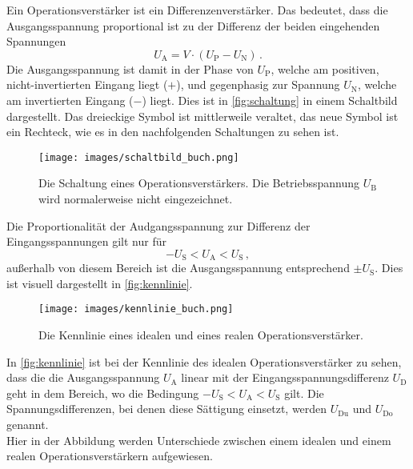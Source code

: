         \noindent 
        Ein Operationsverstärker ist ein Differenzenverstärker. Das bedeutet, dass die Ausgangsspannung proportional ist zu der Differenz der beiden 
        eingehenden Spannungen 
        \begin{equation*}
            U_\text{A} = V \cdot \left( U_\text{P} - U_\text{N}\right)\, .
        \end{equation*}
        Die Ausgangsspannung ist damit in der Phase von $U_\text{P}$, welche am positiven, nicht-invertierten Eingang liegt ($+$), und gegenphasig zur 
        Spannung $U_\text{N}$, welche am invertierten Eingang ($-$) liegt. Dies ist in \autoref{fig:schaltung} in einem Schaltbild dargestellt. 
        Das dreieckige Symbol ist mittlerweile veraltet, das neue Symbol ist ein Rechteck, wie es in den nachfolgenden Schaltungen zu sehen ist. 
        \begin{figure}%
            \centering%
            \texttt{[image: images/schaltbild\_buch.png]}%
            \caption{Die Schaltung eines Operationsverstärkers. Die Betriebsspannung $U_\text{B}$ wird normalerweise nicht eingezeichnet. \cite{BrabetzHaasSpieker+2015}}%
            \label{fig:schaltung}%
        \end{figure}%
        Die Proportionalität der Audgangsspannung zur Differenz der Eingangsspannungen gilt nur für 
        \begin{equation*}
            - U_\text{S} < U_\text{A} < U_\text{S}\, ,
        \end{equation*}
        außerhalb von diesem Bereich ist die Ausgangsspannung entsprechend $\pm U_\text{S}$. Dies ist visuell dargestellt in \autoref{fig:kennlinie}.
        \begin{figure}%
            \centering%
            \texttt{[image: images/kennlinie\_buch.png]}%
            \caption{Die Kennlinie eines idealen und eines realen Operationsverstärker. \cite{BrabetzHaasSpieker+2015}}%
            \label{fig:kennlinie}%
        \end{figure}%
        In \autoref{fig:kennlinie} ist bei der Kennlinie des idealen Operationsverstärker zu sehen, dass die die Ausgangsspannung $U_\text{A}$ linear 
        mit der Eingangsspannungsdifferenz $U_\text{D}$ geht in dem Bereich, wo die Bedingung $- U_\text{S} < U_\text{A} < U_\text{S}$ gilt. 
        Die Spannungsdifferenzen, bei denen diese Sättigung einsetzt, werden $U_\text{Du}$ und $U_\text{Do}$ genannt. \\
        Hier in der Abbildung werden Unterschiede zwischen einem idealen und einem realen Operationsverstärkern aufgewiesen. 
